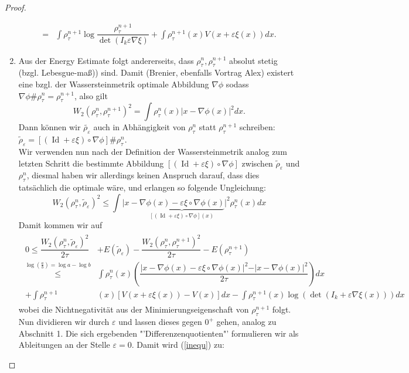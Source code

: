 \documentclass[11pt,a4paper,notitlepage]{scrreprt}
\begin{document}
\begin{proof}
\begin{enumerate}
\begin{align}
=&\int \rho_\tau^{n+1}\log\dfrac{\rho_\tau^{n+1}}{\det(I_k\varepsilon \nabla \xi)}+\int \rho_\tau^{n+1}(x)V(x+\varepsilon\xi(x))dx.
\end{align}
\item Aus der Energy Estimate folgt andererseits, dass $\rho_\tau^n, \rho_\tau^{n+1}$ absolut stetig (bzgl. Lebesgue-maß)) sind. Damit (Brenier, ebenfalls Vortrag Alex) existert eine bzgl. der Wassersteinmetrik optimale Abbildung $\nabla \phi$ sodass $\nabla \phi \# \rho_\tau^n=\rho_\tau^{n+1}$, also gilt
\begin{equation}
W_2(\rho_\tau^n,\rho_\tau^{n+1})^2=\int \rho_\tau^n(x)\vert x-\nabla\phi(x)\vert^2 dx.
\end{equation}
Dann können wir $\tilde{\rho_\varepsilon}$ auch in Abhängigkeit von $\rho_\tau^n$ statt $\rho_\tau^{n+1}$ schreiben: $\tilde{\rho}_\varepsilon=[(\operatorname{Id}+\varepsilon\xi)\circ\nabla\phi]\#\rho_\tau^n$.\\
Wir verwenden nun nach der Definition der Wassersteinmetrik analog zum letzten Schritt die bestimmte Abbildung $[(\operatorname{Id}+\varepsilon\xi)\circ\nabla\phi]$ zwischen $\tilde{\rho}_\varepsilon$ und $\rho_\tau^n$, diesmal haben wir allerdings keinen Anspruch darauf, dass dies tatsächlich die optimale wäre, und erlangen so folgende Ungleichung:
\begin{equation*}
W_2(\rho_\tau^n,\tilde{\rho}_\varepsilon)^2 \leq \int \vert x-\underset{[(\operatorname{Id}+\varepsilon\xi)\circ\nabla\phi](x)}{\underbrace{\nabla \phi(x)-\varepsilon\xi\circ\nabla\phi(x)}}\vert^2 \rho_\tau^n(x)dx
\end{equation*}
Damit kommen wir auf
\begin{align}
\begin{split}
0\leq\dfrac{W_2(\rho_\tau^n,\tilde{\rho}_\varepsilon)^2}{2\tau}&+E(\tilde{\rho}_\varepsilon)-\dfrac{W_2(\rho_\tau^n,\rho_\tau^{n+1})^2}{2\tau}-E(\rho_\tau^{n+1})\\
\overset{\log(\frac{a}{b})=\log a-\log b}\leq&\int\rho_\tau^n(x)\left(\dfrac{\vert x-\nabla \phi(x)-\varepsilon\xi\circ\nabla\phi(x)\vert^2-\vert x-\nabla\phi(x)\vert^2}{2\tau}\right)dx\\
+\int\rho_\tau^{n+1}&(x)[V(x+\varepsilon\xi(x))-V(x)]dx-\int\rho_\tau^{n+1}(x)\log( \det(I_k+\varepsilon\nabla\xi(x)))dx \label{inequ}
\end{split}
\end{align}
wobei die Nichtnegativität aus der Minimierungseigenschaft von $\rho_\tau^{n+1}$ folgt.\\
Nun dividieren wir durch $\varepsilon$ und lassen dieses gegen $0^+$ gehen, analog zu Abschnitt 1. Die sich ergebenden "'Differenzenquotienten"' formulieren wir als Ableitungen an der Stelle $\varepsilon=0$. Damit wird (\ref{inequ}) zu: 

\end{enumerate}
\end{proof}
\end{document}
